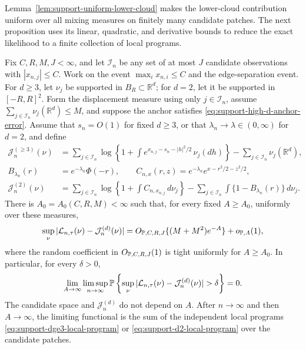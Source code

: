 Lemma~\ref{lem:support-uniform-lower-cloud} makes the lower-cloud contribution
uniform over all mixing measures on finitely many candidate patches. The next
proposition uses its linear, quadratic, and derivative bounds to reduce the
exact likelihood to a finite collection of local programs.
\begin{proposition}
\label{prop:support-finite-patch-expansion}
Fix \(C,R,M,J<\infty\), and let \(\mathcal I_n\) be any set of at most \(J\)
candidate observations with \(|x_{n,j}|\le C\).  Work on the event
\(\max_i x_{n,i}\le C\) and the edge-separation event.  For \(d\ge3\), let
\(\nu_j\) be supported in \(B_R\subset\mathbb R^d\); for \(d=2\), let it be
supported in \([-R,R]^2\).  Form the displacement measure using only
\(j\in\mathcal I_n\), assume \(\sum_{j\in\mathcal I_n}\nu_j(\mathbb R^d)\le M\),
and suppose the anchor satisfies \eqref{eq:support-high-d-anchor-error}.  Assume
that \(s_n=O(1)\) for fixed \(d\ge3\), or that
\(\lambda_n\to\lambda\in(0,\infty)\) for \(d=2\), and define
\[
\begin{aligned}
 \mathcal J_n^{(\ge3)}(\nu)
 &=\sum_{j\in\mathcal I_n}\log\left\{1+\int
 e^{x_{n,j}-s_n-|h|^2/2}\,\nu_j(dh)\right\}
 -\sum_{j\in\mathcal I_n}\nu_j(\mathbb R^d),\\
 B_{\lambda_n}(r)&=e^{-\lambda_n}\Phi(-r),\qquad
 C_{n,x}(r,z)=e^{-\lambda_n}e^{x-r^2/2-z^2/2},\\
 \mathcal J_n^{(2)}(\nu)
 &=\sum_{j\in\mathcal I_n}\log\left\{1+\int C_{n,x_{n,j}}\,d\nu_j\right\}
 -\sum_{j\in\mathcal I_n}\int\{1-B_{\lambda_n}(r)\}\,d\nu_j.
\end{aligned}
\]
There is \(A_0=A_0(C,R,M)<\infty\) such that, for every fixed
\(A\ge A_0\), uniformly over these measures,
\begin{equation}
\label{eq:support-finite-patch-error}
 \sup_\nu|\mathcal L_{n,\tau}(\nu)-\mathcal J_n^{(d)}(\nu)|
 =O_{\mathbb P,C,R,J}\{(M+M^2)e^{-A}\}+o_{\mathbb P,A}(1),
\end{equation}
where the random coefficient in \(O_{\mathbb P,C,R,J}(1)\) is tight uniformly for
\(A\ge A_0\).  In particular, for every \(\delta>0\),
\begin{equation}
\label{eq:support-finite-patch-iterated}
 \lim_{A\to\infty}\limsup_{n\to\infty}
 \Pbb\left\{
  \sup_\nu|\mathcal L_{n,\tau}(\nu)-\mathcal J_n^{(d)}(\nu)|>\delta
 \right\}=0.
\end{equation}
The candidate space and \(\mathcal J_n^{(d)}\) do not depend on \(A\).  After
\(n\to\infty\) and then \(A\to\infty\), the limiting functional is the sum
of the independent local programs
\eqref{eq:support-dge3-local-program} or
\eqref{eq:support-d2-local-program} over the candidate patches.
\end{proposition}

